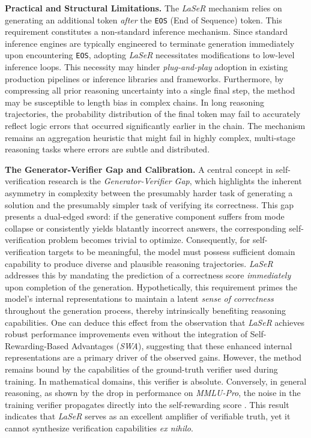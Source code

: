 \documentclass[a4paper,oneside,10pt,ngerman,english]{scrartcl}
\begin{document}
\textbf{Practical and Structural Limitations.} The \textit{LaSeR} mechanism relies on generating an additional token \textit{after} the \texttt{EOS} (End of Sequence) token. This requirement constitutes a non-standard inference mechanism. Since standard inference engines are typically engineered to terminate generation immediately upon encountering \texttt{EOS}, adopting \textit{LaSeR} necessitates modifications to low-level inference loops. This necessity may hinder \textit{plug-and-play} adoption in existing production pipelines or inference libraries and frameworks. Furthermore, by compressing all prior reasoning uncertainty into a single final step, the method may be susceptible to length bias in complex chains. In long reasoning trajectories, the probability distribution of the final token may fail to accurately reflect logic errors that occurred significantly earlier in the chain. The mechanism remains an aggregation heuristic that might fail in highly complex, multi-stage reasoning tasks where errors are subtle and distributed.

\textbf{The Generator-Verifier Gap and Calibration.} A central concept in self-verification research is the \textit{Generator-Verifier Gap}, which highlights the inherent asymmetry in complexity between the presumably harder task of generating a solution and the presumably simpler task of verifying its correctness. This gap presents a dual-edged sword: if the generative component suffers from mode collapse or consistently yields blatantly incorrect answers, the corresponding self-verification problem becomes trivial to optimize. Consequently, for self-verification targets to be meaningful, the model must possess sufficient domain capability to produce diverse and plausible reasoning trajectories. \textit{LaSeR} addresses this by mandating the prediction of a correctness score \textit{immediately} upon completion of the generation. Hypothetically, this requirement primes the model's internal representations to maintain a latent \textit{sense of correctness} throughout the generation process, thereby intrinsically benefiting reasoning capabilities. One can deduce this effect from the observation that \textit{LaSeR} achieves robust performance improvements even without the integration of Self-Rewarding-Based Advantages (\textit{SWA}), suggesting that these enhanced internal representations are a primary driver of the observed gains. However, the method remains bound by the capabilities of the ground-truth verifier used during training. In mathematical domains, this verifier is absolute. Conversely, in general reasoning, as shown by the drop in performance on \textit{MMLU-Pro}, the noise in the training verifier propagates directly into the self-rewarding score \citep{laser}. This result indicates that \textit{LaSeR} serves as an excellent amplifier of verifiable truth, yet it cannot synthesize verification capabilities \textit{ex nihilo}.
\end{document}
